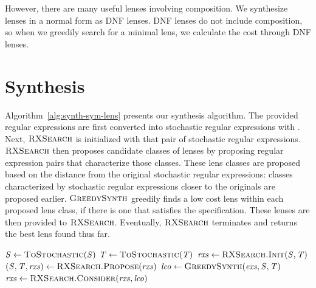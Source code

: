 \documentclass[acmsmall,screen,anonymous]{acmart}
\begin{document}
However, there are many useful lenses involving composition. We synthesize
lenses in a normal form as DNF lenses. DNF lenses do not include composition, so
when we greedily search for a minimal lens, we calculate the cost through DNF
lenses.


\section{Synthesis}
\label{sec:synthesis}
Algorithm~\ref{alg:synth-sym-lens} presents our synthesis algorithm. The
provided regular expressions are first converted into stochastic regular
expressions with \ToStochastic. Next, $\RXSearch$ is initialized with that pair
of stochastic regular expressions. $\RXSearch$ then proposes candidate classes
of lenses by proposing regular expression pairs that characterize those classes.
These lens classes are proposed based on the distance from the original
stochastic regular expressions: classes characterized by stochastic regular
expressions closer to the originals are proposed earlier. $\GreedySynth$
greedily finds a low cost lens within each proposed lens class, if there is one
that satisfies the specification. These lenses are then provided to $\RXSearch$.
Eventually, $\RXSearch$ terminates and returns the best lens found thus far.

\begin{algorithm}
  \caption{\SynthSymLens}
  \label{alg:synth-sym-lens}
  \begin{algorithmic}[1]
    \State $\Regex \gets \Call{\ToStochastic}{\Regex}$
    \State $\RegexAlt \gets \Call{\ToStochastic}{\RegexAlt}$
    \State $\RXSearchState \gets \Call{\RXSearch.Init}{\Regex,\RegexAlt}$
    \State $(\Regex,\RegexAlt,\RXSearchState) \gets \Call{\RXSearch.Propose}{\RXSearchState}$
    \State $\LCO \gets \Call{\GreedySynth}{\Examples,\Regex,\RegexAlt}$
    \State $\RXSearchState \gets \Call{\RXSearch.Consider}{\RXSearchState,\LCO}$
    \EndWhile
    \EndFunction
  \end{algorithmic}
\end{algorithm}
\end{document}
